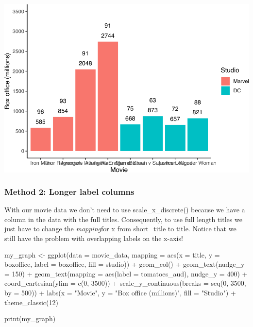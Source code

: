 \documentclass[
]{krantz}
\makeatletter
\newenvironment{Shaded}{\begin{snugshade}}{\end{snugshade}}
\newcommand{\AttributeTok}[1]{\textcolor[rgb]{0.61,0.61,0.61}{#1}}
\newcommand{\DecValTok}[1]{\textcolor[rgb]{0.06,0.06,0.06}{#1}}
\newcommand{\FunctionTok}[1]{\textcolor[rgb]{0,0,0}{#1}}
\newcommand{\NormalTok}[1]{#1}
\newcommand{\OtherTok}[1]{\textcolor[rgb]{0.37,0.37,0.37}{#1}}
\newcommand{\SpecialCharTok}[1]{\textcolor[rgb]{0,0,0}{#1}}
\newcommand{\StringTok}[1]{\textcolor[rgb]{0.5,0.5,0.5}{#1}}
\newenvironment{kframe}{%
\medskip{}
\setlength{\fboxsep}{.8em}
 \def\at@end@of@kframe{}%
 \ifinner\ifhmode%
  \def\at@end@of@kframe{\end{minipage}}%
  \begin{minipage}{\columnwidth}%
 \fi\fi%
 \def\FrameCommand##1{\hskip\@totalleftmargin \hskip-\fboxsep
 \colorbox{shadecolor}{##1}\hskip-\fboxsep
     \hskip-\linewidth \hskip-\@totalleftmargin \hskip\columnwidth}%
 \MakeFramed {\advance\hsize-\width
   \@totalleftmargin\z@ \linewidth\hsize
   \@setminipage}}%
 {\par\unskip\endMakeFramed%
 \at@end@of@kframe}
\renewenvironment{Shaded}{\begin{kframe}}{\end{kframe}}
\makeatother
\begin{document}
\includegraphics[width=0.65\linewidth]{bookdown_files/figure-latex/unnamed-chunk-212-1}

\hypertarget{method-2-longer-label-columns}{%
\subsubsection{Method 2: Longer label columns}\label{method-2-longer-label-columns}}

With our movie data we don't need to use scale\_x\_discrete() because we have a column in the data with the full titles. Consequently, to use full length titles we just have to change the \emph{mapping}for x from short\_title to title. Notice that we still have the problem with overlapping labels on the x-axis!

\begin{Shaded}
\begin{Highlighting}[]
\NormalTok{my\_graph }\OtherTok{\textless{}{-}} \FunctionTok{ggplot}\NormalTok{(}\AttributeTok{data =}\NormalTok{ movie\_data,}
           \AttributeTok{mapping =} \FunctionTok{aes}\NormalTok{(}\AttributeTok{x =}\NormalTok{ title,}
                         \AttributeTok{y =}\NormalTok{ boxoffice,}
                         \AttributeTok{label =}\NormalTok{ boxoffice, }
                         \AttributeTok{fill =}\NormalTok{ studio)) }\SpecialCharTok{+}
  \FunctionTok{geom\_col}\NormalTok{() }\SpecialCharTok{+}
  \FunctionTok{geom\_text}\NormalTok{(}\AttributeTok{nudge\_y =} \DecValTok{150}\NormalTok{)  }\SpecialCharTok{+}
  \FunctionTok{geom\_text}\NormalTok{(}\AttributeTok{mapping =} \FunctionTok{aes}\NormalTok{(}\AttributeTok{label =}\NormalTok{ tomatoes\_aud), }
            \AttributeTok{nudge\_y =} \DecValTok{400}\NormalTok{) }\SpecialCharTok{+}
  \FunctionTok{coord\_cartesian}\NormalTok{(}\AttributeTok{ylim =} \FunctionTok{c}\NormalTok{(}\DecValTok{0}\NormalTok{, }\DecValTok{3500}\NormalTok{)) }\SpecialCharTok{+}
  \FunctionTok{scale\_y\_continuous}\NormalTok{(}\AttributeTok{breaks =} \FunctionTok{seq}\NormalTok{(}\DecValTok{0}\NormalTok{, }\DecValTok{3500}\NormalTok{, }\AttributeTok{by =} \DecValTok{500}\NormalTok{)) }\SpecialCharTok{+}
  \FunctionTok{labs}\NormalTok{(}\AttributeTok{x =} \StringTok{"Movie"}\NormalTok{,}
       \AttributeTok{y =} \StringTok{"Box office (millions)"}\NormalTok{,}
       \AttributeTok{fill =} \StringTok{"Studio"}\NormalTok{) }\SpecialCharTok{+}
  \FunctionTok{theme\_classic}\NormalTok{(}\DecValTok{12}\NormalTok{)}
  

\FunctionTok{print}\NormalTok{(my\_graph)}
\end{Highlighting}
\end{Shaded}
\end{document}
